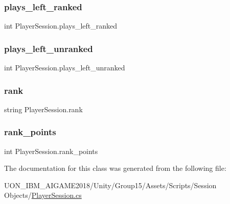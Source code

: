 \subsubsection{\texorpdfstring{plays\_left\_ranked}{plays\_left\_ranked}}
{\footnotesize\ttfamily int Player\+Session.\+plays\+\_\+left\+\_\+ranked}

\mbox{\label{class_player_session_a0e78485525b4c9cedb9056ad65767d94}} 
\subsubsection{\texorpdfstring{plays\_left\_unranked}{plays\_left\_unranked}}
{\footnotesize\ttfamily int Player\+Session.\+plays\+\_\+left\+\_\+unranked}

\mbox{\label{class_player_session_a40ae843028dbcdbdd441078b88ea5cd0}} 
\subsubsection{\texorpdfstring{rank}{rank}}
{\footnotesize\ttfamily string Player\+Session.\+rank}

\mbox{\label{class_player_session_ac6cb4814f73c3e70feabc2d87d39ff3c}} 
\subsubsection{\texorpdfstring{rank\_points}{rank\_points}}
{\footnotesize\ttfamily int Player\+Session.\+rank\+\_\+points}



The documentation for this class was generated from the following file\+:\begin{DoxyCompactItemize}
\item 
U\+O\+N\+\_\+\+I\+B\+M\+\_\+\+A\+I\+G\+A\+M\+E2018/\+Unity/\+Group15/\+Assets/\+Scripts/\+Session Objects/\mbox{\hyperlink{_player_session_8cs}{Player\+Session.\+cs}}\end{DoxyCompactItemize}
